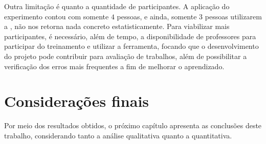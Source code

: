 		Outra limitação é quanto a quantidade de participantes.
		A aplicação do experimento contou com somente $4$ pessoas, e ainda, somente $3$ pessoas
		utilizarem a , não nos retorna nada concreto estatisticamente.
		Para
		viabilizar mais participantes, é necessário, além de tempo, a disponibilidade
		de professores para participar do treinamento e utilizar a ferramenta, focando
		que o desenvolvimento do projeto pode contribuir para avaliação de trabalhos,
		além de possibilitar a verificação dos erros mais frequentes a fim de melhorar o
		aprendizado.

	\section{Considerações finais}
	
		Por meio dos resultados obtidos, o próximo capítulo apresenta as conclusões deste trabalho, considerando tanto a análise qualitativa quanto a quantitativa.
